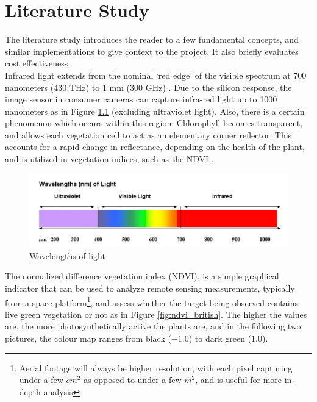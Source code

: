 \chapter{Literature Study}
\label{sec:lit}

The literature study introduces the reader to a few fundamental concepts, and similar implementations to give context to the project. It also briefly evaluates cost effectiveness.\\

Infrared light extends from the nominal `red edge' of the visible spectrum at 700 nanometers (430 THz) to 1 mm (300 GHz) \cite{ir_wiki}. Due to the silicon response, the image sensor in consumer cameras can capture infra-red light up to 1000 nanometers \cite{ir_wiki} as in Figure \ref{fig:ir_spectrum} (excluding ultraviolet light). Also, there is a certain phenomenon which occurs within this region. Chlorophyll becomes transparent, and allows each vegetation cell to act as an elementary corner reflector. This accounts for a rapid change in reflectance, depending on the health of the plant, and is utilized in vegetation indices, such as the NDVI \cite{red_edge}.

\begin{figure}[H]
\centering
\includegraphics[scale=0.35]{images/ir_spectrum.png}
\caption{Wavelengths of light \cite{ir_spectrum}}
\label{fig:ir_spectrum}
\end{figure}


The normalized difference vegetation index (NDVI), is a simple graphical indicator that can be used to analyze remote sensing measurements, typically from a space platform\footnote{Aerial footage will always be higher resolution, with each pixel capturing under a few $cm^2$ as opposed to under a few $m^2$, and is useful for more in-depth analysis}, and assess whether the target being observed contains live green vegetation or not\cite{ndvi_wiki} as in Figure \ref{fig:ndvi_british}. The higher the values are, the more photosynthetically active the plants are, and in the following two pictures, the colour map ranges from black ($-1.0$) to dark green ($1.0$).

